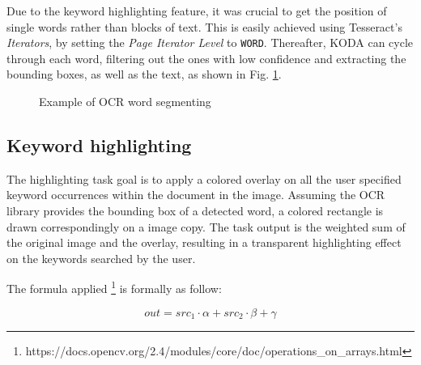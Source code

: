 \documentclass[a4paper]{article}
\begin{document}
Due to the keyword highlighting feature, it was crucial to get the position of single words rather than blocks of text. This is easily achieved using Tesseract's \textit{Iterators}, by setting the \textit{Page Iterator Level} to \texttt{WORD}. Thereafter, KODA can cycle through each word, filtering out the ones with low confidence and extracting the bounding boxes, as well as the text, as shown in Fig. \ref{fig:ocr}.

\begin{figure}[H]
	\caption{Example of OCR word segmenting}
	\label{fig:ocr}
\end{figure}

\subsection{Keyword highlighting}

The highlighting task goal is to apply a colored overlay on all the user specified keyword occurrences within the document in the image. Assuming the OCR library provides the bounding box of a detected word, a colored rectangle is drawn correspondingly on a image copy. The task output is the weighted sum of the original image and the overlay, resulting in a transparent highlighting effect on the keywords searched by the user. 

The formula applied \footnote{https://docs.opencv.org/2.4/modules/core/doc/operations\_on\_arrays.html} is formally as follow: %

\begin{equation}
	out = src_1 \cdot \alpha + src_2 \cdot \beta + \gamma
\end{equation}
\end{document}
